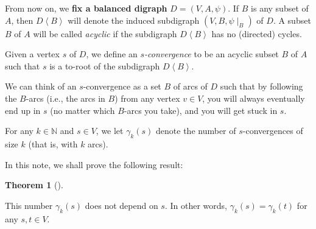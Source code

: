 \documentclass[numbers=enddot,12pt,final,onecolumn,notitlepage]{scrartcl}%
\theoremstyle{definition}
\newtheorem{theo}{Theorem}[section]
\newenvironment{theorem}[1][]
{\begin{theo}[#1]\begin{leftbar}}
{\end{leftbar}\end{theo}}
\theoremstyle{plainsl}
\begin{document}
From now on, we \textbf{fix a balanced digraph }$D=\left(  V,A,\psi\right)  $.
If $B$ is any subset of $A$, then $D\left\langle B\right\rangle $ will denote
the induced subdigraph $\left(  V,B,\psi\mid_{B}\right)  $ of $D$. A subset
$B$ of $A$ will be called \emph{acyclic} if the subdigraph $D\left\langle
B\right\rangle $ has no (directed) cycles.

Given a vertex $s$ of $D$, we define an $s$\emph{-convergence} to be an
acyclic subset $B$ of $A$ such that $s$ is a to-root of the subdigraph
$D\left\langle B\right\rangle $.

We can think of an $s$-convergence as a set $B$ of arcs of $D$ such that by
following the $B$-arcs (i.e., the arcs in $B$) from any vertex $v\in V$, you
will always eventually end up in $s$ (no matter which $B$-arcs you take), and
you will get stuck in $s$.

For any $k\in\mathbb{N}$ and $s\in V$, we let $\gamma_{k}\left(  s\right)  $
denote the number of $s$-convergences of size $k$ (that is, with $k$ arcs).

In this note, we shall prove the following result:

\begin{theorem}
\label{thm.balgamma}This number $\gamma_{k}\left(  s\right)  $ does not depend
on $s$. In other words, $\gamma_{k}\left(  s\right)  =\gamma_{k}\left(
t\right)  $ for any $s,t\in V$.
\end{theorem}
\end{document}

